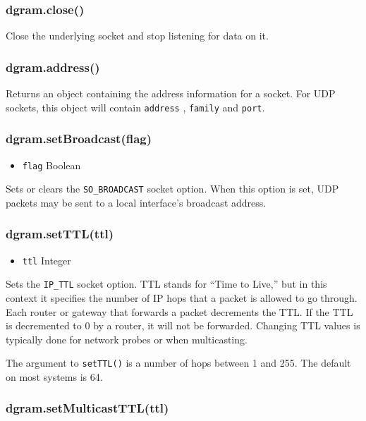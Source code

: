 \subsubsection{dgram.close()}

Close the underlying socket and stop listening for data on it.

\subsubsection{dgram.address()}

Returns an object containing the address information for a socket. For
UDP sockets, this object will contain \texttt{address} , \texttt{family}
and \texttt{port}.

\subsubsection{dgram.setBroadcast(flag)}

\begin{itemize}
\item
  \texttt{flag} Boolean
\end{itemize}

Sets or clears the \texttt{SO\_BROADCAST} socket option. When this
option is set, UDP packets may be sent to a local interface's broadcast
address.

\subsubsection{dgram.setTTL(ttl)}

\begin{itemize}
\item
  \texttt{ttl} Integer
\end{itemize}

Sets the \texttt{IP\_TTL} socket option. TTL stands for ``Time to
Live,'' but in this context it specifies the number of IP hops that a
packet is allowed to go through. Each router or gateway that forwards a
packet decrements the TTL. If the TTL is decremented to 0 by a router,
it will not be forwarded. Changing TTL values is typically done for
network probes or when multicasting.

The argument to \texttt{setTTL()} is a number of hops between 1 and 255.
The default on most systems is 64.

\subsubsection{dgram.setMulticastTTL(ttl)}

